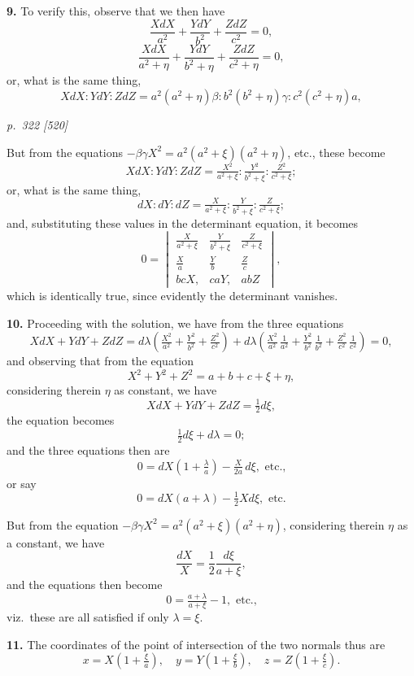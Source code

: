 \documentclass[11pt,a4paper]{article}
\theoremstyle{plain}
\theoremstyle{definition}
\begin{document}
\textbf{9.} To verify this, observe that we then have
\[
\frac{X dX}{a^2} + \frac{Y dY}{b^2} + \frac{Z dZ}{c^2} = 0,
\]
\[
\frac{X dX}{a^2 + \eta} + \frac{Y dY}{b^2 + \eta} + \frac{Z dZ}{c^2 + \eta} = 0,
\]
or, what is the same thing,
\[
X dX : Y dY : Z dZ = a^2(a^2 + \eta)\beta : b^2(b^2 + \eta)\gamma : c^2(c^2 + \eta)a,
\]

\clearpage

\bigskip
\textit{p.~322 [520]}
\smallskip

But from the equations $-\beta\gamma X^2 = a^2(a^2 + \xi)(a^2 + \eta)$, etc., these become
\[
X dX : Y dY : Z dZ = \tfrac{X^2}{a^2 + \xi} : \tfrac{Y^2}{b^2 + \xi} : \tfrac{Z^2}{c^2 + \xi};
\]
or, what is the same thing,
\[
dX : dY : dZ = \tfrac{X}{a^2 + \xi} : \tfrac{Y}{b^2 + \xi} : \tfrac{Z}{c^2 + \xi};
\]
and, substituting these values in the determinant equation, it becomes
\[
0 = \begin{vmatrix} \tfrac{X}{a^2 + \xi} & \tfrac{Y}{b^2 + \xi} & \tfrac{Z}{c^2 + \xi}\\
\tfrac{X}{a} & \tfrac{Y}{b} & \tfrac{Z}{c}\\
b cX, & caY, & abZ \end{vmatrix},
\]
which is identically true, since evidently the determinant vanishes.

\textbf{10.} Proceeding with the solution, we have from the three equations
\[
X dX + Y dY + Z dZ = d\lambda\!\left(\tfrac{X^2}{a^2} + \tfrac{Y^2}{b^2} + \tfrac{Z^2}{c^2}\right) + d\lambda\!\left(\tfrac{X^2}{a^2}\,\tfrac{1}{a^2} + \tfrac{Y^2}{b^2}\,\tfrac{1}{b^2} + \tfrac{Z^2}{c^2}\,\tfrac{1}{c^2}\right) = 0,
\]
and observing that from the equation
\[
X^2 + Y^2 + Z^2 = a + b + c + \xi + \eta,
\]
considering therein $\eta$ as constant, we have
\[
X dX + Y dY + Z dZ = \tfrac{1}{2}d\xi,
\]
the equation becomes
\[
\tfrac{1}{2}d\xi + d\lambda = 0;
\]
and the three equations then are
\[
0 = dX\left(1 + \tfrac{\lambda}{a}\right) - \tfrac{X}{2 a}\,d\xi, \text{ etc.,}
\]
or say
\[
0 = dX(a + \lambda) - \tfrac{1}{2}X d\xi, \text{ etc.}
\]

But from the equation $-\beta\gamma X^2 = a^2(a^2 + \xi)(a^2 + \eta)$, considering therein $\eta$ as a constant, we have
\[
\frac{dX}{X} = \frac{1}{2}\frac{d\xi}{a + \xi},
\]
and the equations then become
\[
0 = \tfrac{a + \lambda}{a + \xi} - 1, \text{ etc.,}
\]
viz.\ these are all satisfied if only $\lambda = \xi$.

\textbf{11.} The coordinates of the point of intersection of the two normals thus are
\[
x = X\left(1 + \tfrac{\xi}{a}\right),\quad y = Y\left(1 + \tfrac{\xi}{b}\right),\quad z = Z\left(1 + \tfrac{\xi}{c}\right).
\]
\end{document}
